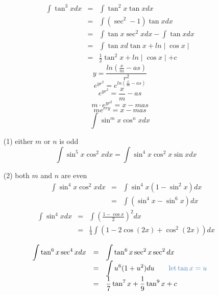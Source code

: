 \begin{eg}
$$\begin{array}{rcl}
\displaystyle \int \tan^3 x dx & = & \displaystyle \int \tan^2 x \tan x dx\\
& = & \displaystyle \int (\sec^2-1) \tan x dx\\
& = & \displaystyle \int \tan x \sec^2 x dx - \int \tan xdx\\
& = & \displaystyle \int \tan x  d\tan x + ln \mid \cos x \mid \\
& = & \displaystyle \frac{1}{2} \tan^2 x + ln \mid \cos x \mid +c
\end{array}$$
$$\displaystyle y = \frac{ln (\frac{x}{m} - as)}{r^2}$$
$$\displaystyle e^{yr^2} = e^{ln(\frac{x}{m} - as)}$$
$$\displaystyle e^{yr^2} = \frac{x}{m} -as$$
$$\displaystyle m\cdot e^{yr^2} = x- mas$$
$$\displaystyle me^{rry} = x-mas$$
$$\displaystyle \int \sin^m x \cos^n x dx$$
\end{eg}
\begin{notn}
\begin{itemize}
\item[(1)] either $m$ or $n$ is odd
$$\displaystyle \int \sin^5 x \cos^2 x dx = \int \sin^4 x \cos^2 x \sin x dx$$
\item[(2)] both $m$ and $n$ are even\\
$$\begin{array}{rcl}
\displaystyle \int \sin^4 x \cos^2 x dx & = & \displaystyle \int \sin^4 x (1-\sin^2 x) dx\\
& = & \displaystyle \int ( \sin^4 x - \sin^6 x)dx
\end{array}$$
$$\begin{array}{rcl}
\displaystyle \int \sin^4x dx & = & \displaystyle \int (\frac{1-\cos x }{2})^2 dx\\
& = & \displaystyle \frac{1}{4} \int (1-2 \cos (2x) + \cos^2 (2x))dx
\end{array}$$
\end{itemize}
\end{notn}
\begin{eg}
$$\begin{array}{rcl}
\displaystyle \int \tan^6 x \sec^4 x dx & = & \displaystyle \int \tan^6 x \sec^2 x \sec^2 dx\\
& = & \displaystyle \int u^6 (1+u^2) du \quad \quad \tssteelblue{\text{let} \tan x = u}\\
& = & \displaystyle \frac{1}{7} \tan^7 x + \frac{1}{9} \tan^9 x +c
\end{array}$$
\end{eg}
